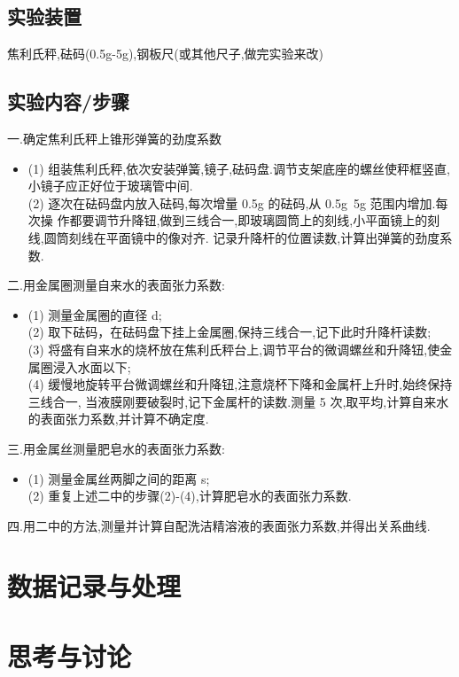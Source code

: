\documentclass[12pt,a4paper,oneside]{ctexart}
\begin{document}
\subsection{实验装置}
焦利氏秤,砝码(0.5g-5g),钢板尺(或其他尺子,做完实验来改)
\subsection{实验内容/步骤}
\noindent
一.确定焦利氏秤上锥形弹簧的劲度系数
\begin{itemize}
    \item[] 
    (1) 组装焦利氏秤,依次安装弹簧,镜子,砝码盘.调节支架底座的螺丝使秤框竖直,
小镜子应正好位于玻璃管中间.\\
(2) 逐次在砝码盘内放入砝码,每次增量 0.5g 的砝码,从 0.5g~5g 范围内增加.每次操
作都要调节升降钮,做到三线合一,即玻璃圆筒上的刻线,小平面镜上的刻线,圆筒刻线在平面镜中的像对齐.
记录升降杆的位置读数,计算出弹簧的劲度系数.
\end{itemize}
二.用金属圈测量自来水的表面张力系数:
\begin{itemize}
    \item[] 
    (1) 测量金属圈的直径 d;\\
(2) 取下砝码，在砝码盘下挂上金属圈,保持三线合一,记下此时升降杆读数;\\
(3) 将盛有自来水的烧杯放在焦利氏秤台上,调节平台的微调螺丝和升降钮,使金属圈浸入水面以下;\\
(4) 缓慢地旋转平台微调螺丝和升降钮,注意烧杯下降和金属杆上升时,始终保持三线合一,
当液膜刚要破裂时,记下金属杆的读数.测量 5 次,取平均,计算自来水的表面张力系数,并计算不确定度.
\end{itemize}
三.用金属丝测量肥皂水的表面张力系数:
\begin{itemize}
    \item[] 
    (1) 测量金属丝两脚之间的距离 s;\\
    (2) 重复上述二中的步骤(2)-(4),计算肥皂水的表面张力系数.
\end{itemize}
四.用二中的方法,测量并计算自配洗洁精溶液的表面张力系数,并得出关系曲线.
\section{数据记录与处理}
\section{思考与讨论}
\end{document}
